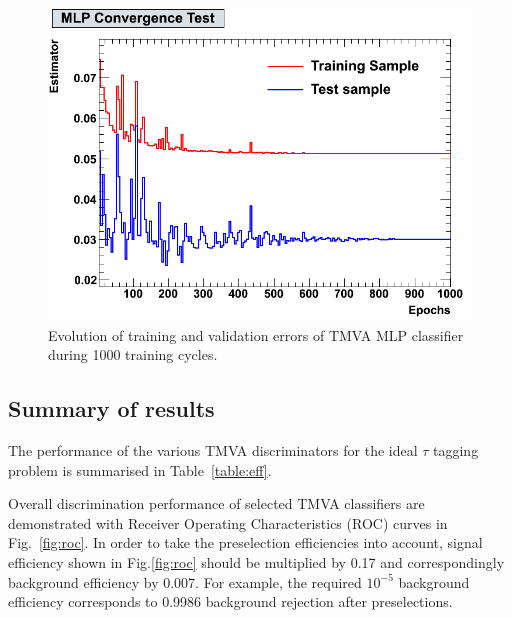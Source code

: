 \documentclass[a4paper]{jpconf}
\begin{document}
\begin{figure}[h]
 \begin{minipage}{8.5cm}
\includegraphics[width=1.0\textwidth]{images/MLPConvergenceTest.png}
\end{minipage}
\begin{minipage}{9.0cm}
\end{minipage}
\begin{minipage}{7.0cm}
\caption{Evolution of training and validation errors of TMVA MLP classifier during 1000 training cycles.}
\end{minipage}
\label{fig:nn}
\end{figure}

\subsection{Summary of results}
The performance of the various TMVA discriminators for the ideal $\tau$ tagging problem
is summarised in Table~\ref{table:eff}.

Overall discrimination performance of selected TMVA classifiers are
demonstrated with Receiver Operating Characteristics (ROC) curves in
Fig.~\ref{fig:roc}.
In order to take the preselection efficiencies into account, 
signal efficiency shown in Fig.\ref{fig:roc} should be multiplied by 0.17 and 
correspondingly background efficiency by 0.007. 
For example, the required $10^{-5}$ background efficiency 
corresponds to 0.9986 background rejection after preselections.
\end{document}
